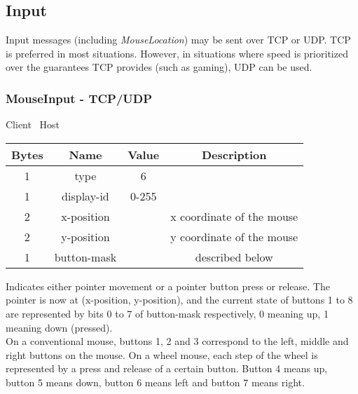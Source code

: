\subsection{Input}

Input messages (including \emph{MouseLocation}) may be sent over TCP or UDP. TCP is preferred in most situations.
However, in situations where speed is prioritized over the guarantees TCP provides (such as gaming), UDP can be
used.

\subsubsection{MouseInput - TCP/UDP}

\begin{center}
    Client \textrightarrow\ Host\\
    \begin{tabular}{|c|c|c|c|}
        \hline
        \textbf{Bytes} & \textbf{Name} & \textbf{Value} & \textbf{Description}      \\
        \hline
        1              & type          & 6              &                           \\
        \hline
        1              & display-id    & 0-255          &                           \\
        \hline
        2              & x-position    &                & x coordinate of the mouse \\
        \hline
        2              & y-position    &                & y coordinate of the mouse \\
        \hline
        1              & button-mask   &                & described below           \\
        \hline
    \end{tabular}
\end{center}

Indicates either pointer movement or a pointer button press or release. The pointer is now at (x-position,
y-position), and the current state of buttons 1 to 8 are represented by bits 0 to 7 of button-mask respectively,
0 meaning up, 1 meaning down (pressed).\\

On a conventional mouse, buttons 1, 2 and 3 correspond to the left, middle and right buttons on the mouse. On a
wheel mouse, each step of the wheel is represented by a press and release of a certain button. Button 4 means up,
button 5 means down, button 6 means left and button 7 means right.\\

